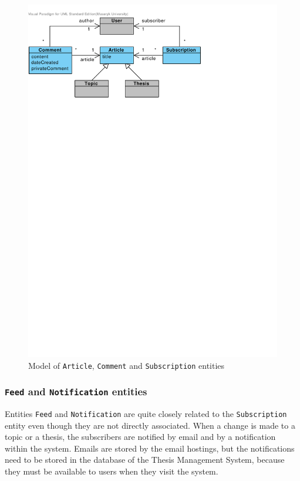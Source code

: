 \begin{figure}[h]
    \centering
        \includegraphics[trim=0 620 180 30, clip, keepaspectratio, width=\textwidth]{./images/domain-article-comment-subscription-entities.pdf}
    \caption{Model of \texttt{Article}, \texttt{Comment} and \texttt{Subscription} entities}
    \label{fig:domain-article-comment-subscription-entities}
\end{figure}

\subsubsection{\textbf{\texttt{Feed} and \texttt{Notification} entities}}

Entities \texttt{Feed} and \texttt{Notification} are quite closely related to the \texttt{Subscription} entity even though they are not directly associated. When a change is made to a topic or a thesis, the subscribers are notified by email and by a notification within the system. Emails are stored by the email hostings, but the notifications need to be stored in the database of the Thesis Management System, because they must be available to users when they visit the system.

